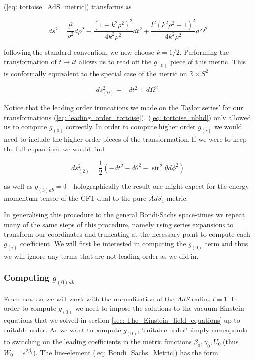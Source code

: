 \documentclass[a4paper,11pt]{article}
\numberwithin{equation}{section}
\begin{document}
\noindent (\ref{eq: tortoise_AdS_metric}) transforms as 

\begin{equation}
ds^2=\frac{l^2}{\rho^2}d\rho^2-\frac{(1+k^2\rho^2)^2}{4k^2\rho^2}dt^2+\frac{l^2(k^2\rho^2-1)^2}{4k^2\rho^2} d\Omega^2
\end{equation}

\noindent following the standard convention, we now choose $k=1/2$. Performing the transformation of $t \rightarrow lt$ allows us to read off the $g_{(0)}$ piece of this metric. This is conformally equivalent to the special case of the metric on $\mathbb{R} \times S^2$ 

\begin{equation}
ds_{(0)}^2=-dt^2+d\Omega^2.
\end{equation}

Notice that the leading order truncations we made on the Taylor series' for our transformations (\ref{eq: leading_order_tortoise}), (\ref{eq: tortoise_nbhd}) only allowed us to compute $g_{(0)}$ correctly. In order to compute higher order $g_{(i)}$ we would need to include the higher order pieces of the transformation. If we were to keep the full expansions we would find 

\begin{equation} \label{eq: pure_AdS_g_2}
ds_{(2)}^2=\frac{1}{2}(-dt^2-d\theta^2-\sin^2\theta d\phi^2)
\end{equation} 

\noindent as well as $g_{(3)ab}=0$ - holographically the result one might expect for the energy momentum tensor of the CFT dual to the pure $AdS_4$ metric. \par

In generalising this procedure to the general Bondi-Sachs space-times we repeat many of the same steps of this procedure, namely using series expansions to transform our coordinates and truncating at the necessary point to compute each $g_{(i)}$ coefficient. We will first be interested in computing the $g_{(0)}$ term and thus we will ignore any terms that are not leading order as we did in. 

\subsubsection{Computing $g_{(0)ab}$}

From now on we will work with the normalisation of the $AdS$ radius $l=1$. In order to compute $g_{(0)}$ we need to impose the solutions to the vacuum Einstein equations that we solved in section \ref{sec: The_Einstein_field_equations} up to suitable order. As we want to compute $g_{(0)}$, `suitable order' simply corresponds to switching on the leading coefficients in the metric functions $\beta_{0}, \gamma_{0}, U_{0}$ (thus $W_{0}=e^{2\beta_{0}}$). The line-element (\ref{eq: Bondi_Sachs_Metric}) has the form 
\end{document}
